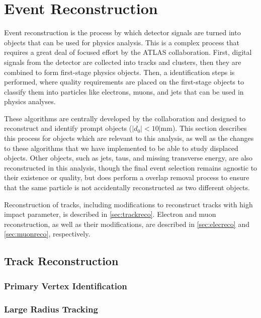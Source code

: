 \chapter{Event Reconstruction}
\label{ch:EventReconstruction}

Event reconstruction is the process by which detector signals are turned into objects that can be used for physics analysis. This is a complex process that requires a great deal of focused effort by the \ac{ATLAS} collaboration. First, digital signals from the detector are collected into tracks and clusters, then they are combined to form first-stage physics objects. Then, a identification steps is performed, where quality requirements are placed on the first-stage objects to classify them into particles like electrons, muons, and jets that can be used in physics analyses. 

These algorithms are centrally developed by the collaboration and designed to reconstruct and identify prompt objects ($|d_{0}| < 10| \textrm{mm}$). This section describes this process for objects which are relevant to this analysis, as well as the changes to these algorithms that we have implemented to be able to study displaced objects. Other objects, such as jets, taus, and missing transverse energy, are also reconstructed in this analysis, though the final event selection remains agnostic to their existence or quality, but does perform a overlap removal process to ensure that the same particle is not accidentally reconstructed as two different objects. 

Reconstruction of tracks, including modifications to reconstruct tracks with high impact parameter, is described in \autoref{sec:trackreco}. Electron and muon reconstruction, as well as their modifications, are described in \autoref{sec:elecreco} and \autoref{sec:muonreco}, respectively. 



\section{Track Reconstruction}
\label{sec:trackreco}

\subsection{Primary Vertex Identification}
\subsection{Large Radius Tracking}


